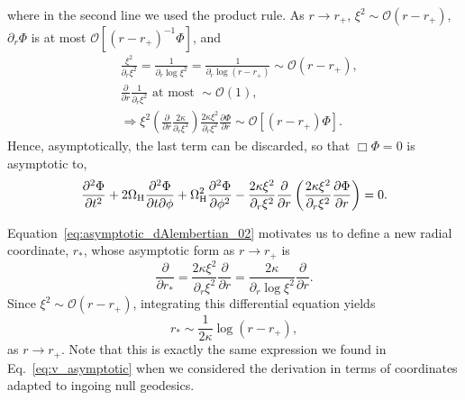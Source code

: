 \documentclass[aps,prx,amsmath,floats,floatfix,twocolumn,
  superscriptaddress,nofootinbib,showpacs]{revtex4-1}
\begin{document}
where in the second line we used the product rule.
As $r \rightarrow r_+ $, $\xi^2 \sim \mathcal{O}(r-r_+) $, $\partial_r \Phi$ is at most $\mathcal{O}\left[\left(r-r_+\right)^{-1} \Phi \right]$, and 
\begin{equation}
\begin{split}
& \frac{\xi^2}{\partial_r \xi^2} = \frac{1}{\partial_r \log \xi^2} = \frac{1}{\partial_r \log (r-r_+)} \sim \mathcal{O}(r-r_+), \\
& \frac{\partial}{\partial r} \frac{1}{\partial_r \xi^2} \text{ at most }\sim \mathcal{O}(1), \\
& \Rightarrow \xi^2 \left( \frac{\partial}{\partial r} \frac{2 \kappa}{\partial_r \xi^2}  \right) \frac{2 \kappa \xi^2 }{\partial_r \xi^2} \frac{\partial \Phi}{\partial r} \sim \mathcal{O}[(r-r_+) \Phi]. 
\end{split}
\end{equation}
Hence, asymptotically, the last term can be discarded, so that $\Box \Phi = 0$ is asymptotic to, 
\begin{equation}
\label{eq:asymptotic_dAlembertian_02}
\frac{\partial^2 \Phi}{\partial t^2} + 2 \Omega_{\rm H} \frac{\partial^2 \Phi}{\partial t \partial \phi}  + \Omega_{\rm H}^2 \frac{\partial^2 \Phi}{\partial \phi^2}  - \frac{2 \kappa\xi^2}{\partial_r \xi^2} \frac{\partial}{\partial r} \left( \frac{2 \kappa \xi^2 }{\partial_r \xi^2} \frac{\partial \Phi}{\partial r} \right) = 0. 
\end{equation}

Equation~\eqref{eq:asymptotic_dAlembertian_02} motivates us to define a new radial coordinate, $r_*$, whose asymptotic form as $r \rightarrow r_+ $ is 
\begin{equation}
\frac{\partial}{\partial r_*} = \frac{2 \kappa\xi^2}{\partial_r \xi^2} \frac{\partial}{\partial r} = \frac{2 \kappa}{\partial_r \log \xi^2} \frac{\partial}{\partial r}.  
\end{equation}
Since $\xi^2 \sim \mathcal{O}(r-r_+)$, integrating this differential equation yields
\begin{equation}
r_* \sim \frac{1}{2 \kappa} \log(r-r_+), 
\end{equation}
as $r \rightarrow r_+ $. Note that this is exactly the same expression we found in Eq.~\eqref{eq:v_asymptotic} when we considered the derivation in terms of coordinates adapted to ingoing null geodesics.  
\end{document}
